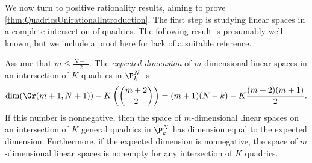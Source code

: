 We now turn to positive rationality results, aiming to prove \cref{thm:QuadricsUnirationalIntroduction}. The first step is studying linear spaces in a complete intersection of quadrics. The following result is presumably well known,    but we include a proof here for lack of a suitable reference.
\begin{lemma}
\label{lem:ExpectedLinearSpaceQuadrics}
Assume that $m \leq \frac{N-1}{2}$. The \emph{expected dimension} of $m$-dimensional linear spaces in an intersection of $K$ quadrics in $\P_k^N$ is 
\[\dim(\Gr(m+1,N+1)) - K\left(\binom{m+2}{2} \right) = (m+1)(N-k) - K\frac{(m+2)(m+1)}{2}. \]
If this number is nonnegative, then the space of $m$-dimensional linear spaces on an intersection of $K$ general quadrics in $\P_k^N$ has dimension equal to the expected dimension. Furthermore, if the expected dimension is nonnegative, the space of $m$-dimensional linear spaces is nonempty for any intersection of $K$ quadrics.
\end{lemma}
